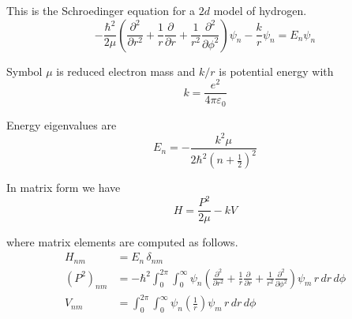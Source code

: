 \documentclass[12pt]{article}
\begin{document}
\noindent
This is the Schroedinger equation for a $2d$ model of hydrogen.
\begin{equation*}
-\frac{\hbar^2}{2\mu}
\left(
\frac{\partial^2}{\partial r^2} +
\frac{1}{r}\frac{\partial}{\partial r}+
\frac{1}{r^2}\frac{\partial^2}{\partial\phi^2}
\right)\psi_n
-\frac{k}{r}\psi_n
=E_n\psi_n
\end{equation*}

\noindent
Symbol $\mu$ is reduced electron mass and $k/r$ is potential energy with
\begin{equation*}
k=\frac{e^2}{4\pi\varepsilon_0}
\end{equation*}

\noindent
Energy eigenvalues are
\begin{equation*}
E_n=-\frac{k^2\mu}{2\hbar^2\left(n+\tfrac{1}{2}\right)^2}
\end{equation*}

\noindent
In matrix form we have
\begin{equation*}
H=\frac{P^2}{2\mu}-kV
\end{equation*}

\noindent
where matrix elements are computed as follows.
\begin{align*}
H_{nm}&=E_n\,\delta_{nm}
\\[2ex]
\left(P^2\right)_{nm}&=-\hbar^2\int_0^{2\pi}\int_0^\infty
\psi_n
\left(
\frac{\partial^2}{\partial r^2} +
\frac{1}{r}\frac{\partial}{\partial r}+
\frac{1}{r^2}\frac{\partial^2}{\partial\phi^2}
\right)
\psi_m
\,r\,dr\,d\phi
\\[2ex]
V_{nm}&=\int_0^{2\pi}\int_0^\infty
\psi_n
\left(\frac{1}{r}\right)
\psi_m
\,r\,dr\,d\phi
\end{align*}
\end{document}
